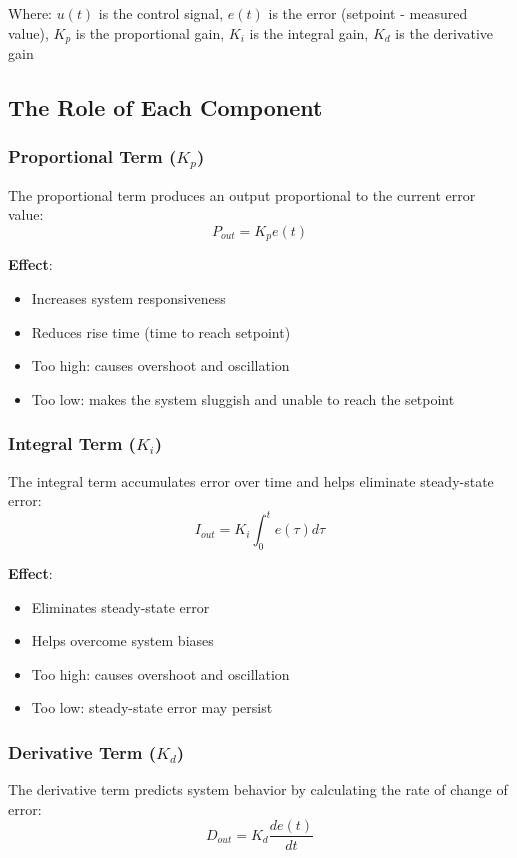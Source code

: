 \documentclass[12pt]{article}
\begin{document}
Where:
$u(t)$ is the control signal, $e(t)$ is the error (setpoint - measured value), $K_p$ is the proportional gain, $K_i$ is the integral gain, $K_d$ is the derivative gain 

\subsection{The Role of Each Component}

\subsubsection{Proportional Term ($K_p$)}
The proportional term produces an output proportional to the current error value: 
\begin{equation}
P_{out} = K_p e(t)
\end{equation}

\textbf{Effect}: 
\begin{itemize}
    \item Increases system responsiveness 
    \item Reduces rise time (time to reach setpoint) 
    \item Too high: causes overshoot and oscillation 
    \item Too low: makes the system sluggish and unable to reach the setpoint 
\end{itemize}

\subsubsection{Integral Term ($K_i$)}
The integral term accumulates error over time and helps eliminate steady-state error: 
\begin{equation}
I_{out} = K_i \int_{0}^{t} e(\tau) d\tau
\end{equation}

\textbf{Effect}:
\begin{itemize}
    \item Eliminates steady-state error 
    \item Helps overcome system biases 
    \item Too high: causes overshoot and oscillation 
    \item Too low: steady-state error may persist 
\end{itemize}

\subsubsection{Derivative Term ($K_d$)}
The derivative term predicts system behavior by calculating the rate of change of error: 
\begin{equation}
D_{out} = K_d \frac{de(t)}{dt}
\end{equation}
\end{document}
